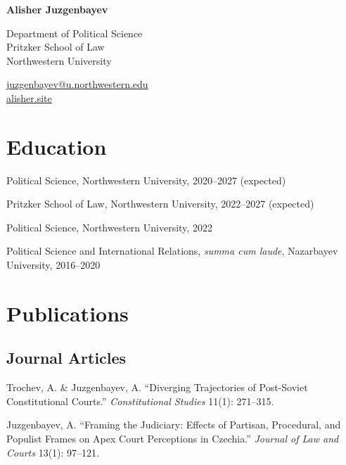 \documentclass[11pt,letterpaper]{report}
\newcommand{\myname}{Alisher Juzgenbayev}
\newcommand{\namefont}[1]{{\normalfont\bfseries\Huge{#1}}}
\begin{document}
    \raggedright{}

    \namefont{\myname}

    \vspace{0.5em}
    \begin{minipage}[t]{0.700\textwidth}
        Department of Political Science \\
        Pritzker School of Law \\
        Northwestern University
    \end{minipage}
    \begin{minipage}[t]{0.295\textwidth}
        \flushright{}
        \href{mailto:juzgenbayev@u.northwestern.edu}{juzgenbayev@u.northwestern.edu} \\
        \href{https://alisher.site}{alisher.site}
    \end{minipage}


    \section*{Education}

    \begin{tablist}

        \item[Ph.D.] \tab{}Political Science, Northwestern University, 2020--2027 (expected)
        \item[J.D.] \tab{}Pritzker School of Law, Northwestern University, 2022--2027 (expected)
        \item[M.A.]  \tab{}Political Science, Northwestern University, 2022
        \item[B.A.]  \tab{}Political Science and International Relations, \textit{summa cum laude}, Nazarbayev University, 2016--2020

    \end{tablist}


    \section*{Publications}

   \subsection*{Journal Articles}

   \begin{tablist}

        \item[2025] \tab{}Trochev, A. \& Juzgenbayev, A. \enquote{Diverging Trajectories of Post-Soviet Constitutional Courts.} \textit{Constitutional Studies} 11(1): 271--315.
        \item[2025] \tab{}Juzgenbayev, A. \enquote{Framing the Judiciary: Effects of Partisan, Procedural, and Populist Frames on Apex Court Perceptions in Czechia.} \textit{Journal of Law and Courts} 13(1): 97--121.

    \end{tablist}
\end{document}
